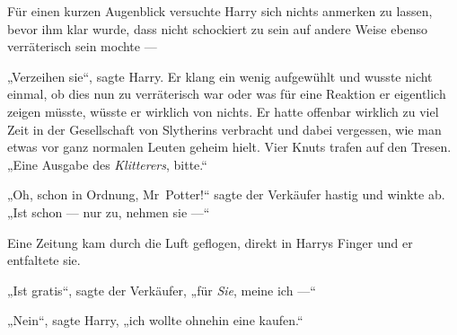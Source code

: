 
Für einen kurzen Augenblick versuchte Harry sich nichts anmerken zu lassen, bevor ihm klar wurde, dass nicht schockiert zu sein auf andere Weise ebenso verräterisch sein mochte —

„Verzeihen sie“, sagte Harry. Er klang ein wenig aufgewühlt und wusste nicht einmal, ob dies nun zu verräterisch war oder was für eine Reaktion er eigentlich zeigen müsste, wüsste er wirklich von nichts. Er hatte offenbar wirklich zu viel Zeit in der Gesellschaft von Slytherins verbracht und dabei vergessen, wie man etwas vor ganz normalen Leuten geheim hielt. Vier Knuts trafen auf den Tresen.
„Eine Ausgabe des \emph{Klitterers}, bitte.“

„Oh, schon in Ordnung, Mr~Potter!“ sagte der Verkäufer hastig und winkte ab.
„Ist schon — nur zu, nehmen sie —“

Eine Zeitung kam durch die Luft geflogen, direkt in Harrys Finger und er entfaltete sie.


„Ist gratis“, sagte der Verkäufer, „für \emph{Sie}, meine ich —“

„Nein“, sagte Harry, „ich wollte ohnehin eine kaufen.“

